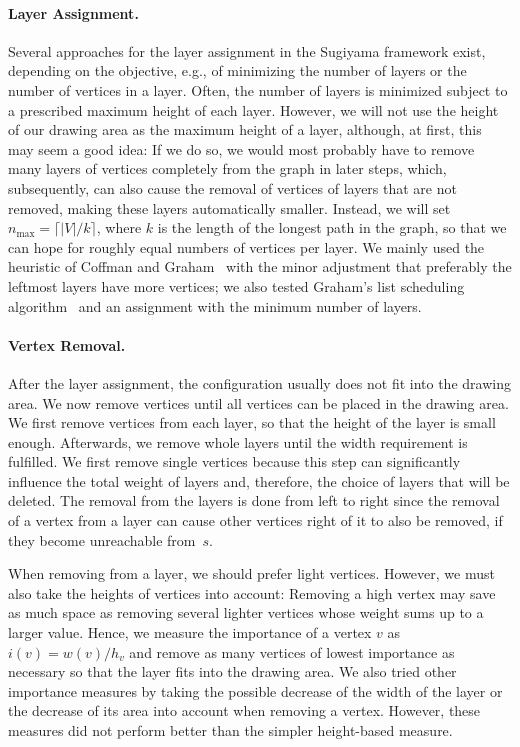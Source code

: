 \documentclass[]{llncs}
\newcommand{\nmax}{\ensuremath{n_\mathrm{max}}\xspace}
\begin{document}
\paragraph{Layer Assignment.}
Several approaches for the layer assignment in the Sugiyama framework
exist, depending on the objective, e.g., of minimizing the number of
layers or the number of vertices in a layer. Often,
the number of layers is minimized subject to a prescribed maximum
height of each layer. However, we will not
use the height of our drawing area as the maximum height of a layer,
although, at first, this may seem a good idea: If we do so, we would
most probably have to remove many layers of vertices completely from
the graph in later steps, which, subsequently, can also cause the
removal of vertices of layers that are not removed, making these
layers automatically smaller. Instead, we will set $\nmax = \lceil
|V| / k \rceil$, where $k$ is the length of the longest path in the graph, so
that we can hope for roughly equal numbers of vertices per layer.
We mainly used the heuristic of Coffman and
Graham~\cite{coffman1972optimal} with the minor adjustment that
preferably the leftmost layers have more vertices; we also tested
Graham's list scheduling algorithm~\cite{6767827} and an assignment with the
minimum number of layers.

\paragraph{Vertex Removal.}
After the layer assignment, the configuration usually
does not fit into the drawing area. We now
remove vertices until all vertices can be placed in the drawing area.
We first remove vertices from each layer, so that the
height of the layer is small enough. Afterwards, we remove whole
layers until the width requirement is fulfilled. We first remove
single vertices because this step can significantly influence the
total weight of layers and, therefore, the choice of layers that will
be deleted. The removal from the layers is done from left to right
since the removal of a vertex from a layer can cause other vertices
right of it to also be removed, if they become unreachable
from~$s$.

When removing from a layer, we should prefer light
vertices. However, we must also take the heights of vertices into
account: Removing a high vertex may save as much space as removing
several lighter vertices whose weight sums up to a larger value.
Hence, we measure the importance of a vertex $v$ as $i(v) =
w(v)/h_v$ and remove as many vertices of lowest importance as
necessary so that the layer fits into the drawing area. We also
tried other importance measures by taking the possible decrease
of the width of the layer or the decrease of its area into account
when removing a vertex. However, these measures did not perform
better than the simpler height-based measure.
\end{document}
